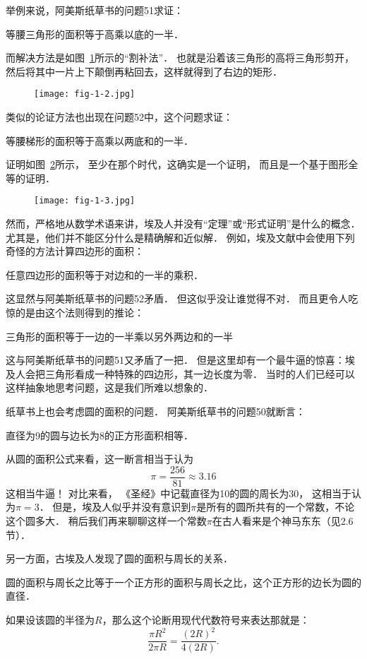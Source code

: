 \documentclass[cn,fancy,blue,11pt]{elegantbook}
\begin{document}
举例来说，阿美斯纸草书的问题51求证：
\begin{framed}
	等腰三角形的面积等于高乘以底的一半．
\end{framed}
而解决方法是如图~\ref{fig:1-2}所示的``割补法''．
也就是沿着该三角形的高将三角形剪开，
然后将其中一片上下颠倒再粘回去，这样就得到了右边的矩形．
\begin{figure}[htbp]
	\centering
	\texttt{[image: fig-1-2.jpg]}
	\caption{\label{fig:1-2}}
\end{figure}
类似的论证方法也出现在问题52中，这个问题求证：
\begin{framed}
	等腰梯形的面积等于高乘以两底和的一半．
\end{framed}
证明如图~\ref{fig:1-3}所示，
至少在那个时代，这确实是一个证明，
而且是一个基于图形全等的证明．
\begin{figure}[htbp]
	\centering
	\texttt{[image: fig-1-3.jpg]}
	\caption{\label{fig:1-3}}
\end{figure}

然而，严格地从数学术语来讲，埃及人并没有``定理''或``形式证明''是什么的概念．
尤其是，他们并不能区分什么是精确解和近似解．
例如，埃及文献中会使用下列奇怪的方法计算四边形的面积：
\begin{framed}
	任意四边形的面积等于对边和的一半的乘积．
\end{framed}
这显然与阿美斯纸草书的问题52矛盾．
但这似乎没让谁觉得不对．
而且更令人吃惊的是由这个法则得到的推论：
\begin{framed}
	三角形的面积等于一边的一半乘以另外两边和的一半
\end{framed}
这与阿美斯纸草书的问题51又矛盾了一把．
但是这里却有一个最牛逼的惊喜：埃及人会把三角形看成一种特殊的四边形，其一边长度为零．
当时的人们已经可以这样抽象地思考问题，这是我们所难以想象的．

纸草书上也会考虑圆的面积的问题．
阿美斯纸草书的问题50就断言：
\begin{framed}
	直径为9的圆与边长为8的正方形面积相等．
\end{framed}
从圆的面积公式来看，这一断言相当于认为
\[\pi=\frac{256}{81}\approx3.16\]
这相当牛逼！
对比来看，
《圣经》中记载直径为10的圆的周长为30，
这相当于认为$\pi=3$．
但是，埃及人似乎并没有意识到$\pi$是所有的圆所共有的一个常数，不论这个圆多大．
稍后我们再来聊聊这样一个常数$\pi$在古人看来是个神马东东（见2.6节）．

另一方面，古埃及人发现了圆的面积与周长的关系．
\begin{framed}
	圆的面积与周长之比等于一个正方形的面积与周长之比，这个正方形的边长为圆的直径．
\end{framed}
如果设该圆的半径为$R$，那么这个论断用现代代数符号来表达那就是：
\[\frac{\pi R^2}{2\pi R}=\frac{(2R)^2}{4(2R)}.\]
\end{document}

